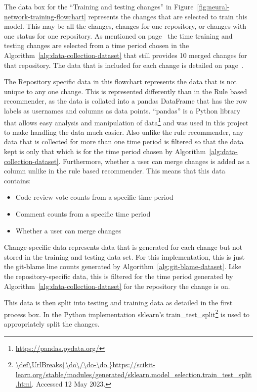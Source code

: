 The data box for the ``Training and testing changes'' in Figure~\ref{fig:neural-network-training-flowchart} represents the changes that are selected to train this model. This may be all the changes, changes for one repository, or changes with one status for one repository. As mentioned on page~\pageref{para:limited-to-ten-merged-changes} the time training and testing changes are selected from a time period chosen in the Algorithm~\ref{alg:data-collection-dataset} that still provides 10 merged changes for that repository. The data that is included for each change is detailed on page~\pageref{para:information-in-each-change-for-testing-data-set}.

The Repository specific data in this flowchart represents the data that is not unique to any one change. This is represented differently than in the Rule based recommender, as the data is collated into a pandas DataFrame that has the row labels as usernames and columns as data points. ``pandas'' is a Python library that allows easy analysis and manipulation of data\footnote{\url{https://pandas.pydata.org/}} and was used in this project to make handling the data much easier. Also unlike the rule recommender, any data that is collected for more than one time period is filtered so that the data kept is only that which is for the time period chosen by Algorithm~\ref{alg:data-collection-dataset}. Furthermore, whether a user can merge changes is added as a column unlike in the rule based recommender. This means that this data contains:
\begin{itemize}
    \item Code review vote counts from a specific time period
    \item Comment counts from a specific time period
    \item Whether a user can merge changes
\end{itemize}

Change-specific data represents data that is generated for each change but not stored in the training and testing data set. For this implementation, this is just the git-blame line counts generated by Algorithm~\ref{alg:git-blame-dataset}. Like the repository-specific data, this is filtered for the time period generated by Algorithm~\ref{alg:data-collection-dataset} for the repository the change is on.

This data is then split into testing and training data as detailed in the first process box. In the Python implementation sklearn's train\_test\_split\footnote{\url{\def\UrlBreaks{\do\/\do-\do.}https://scikit-learn.org/stable/modules/generated/sklearn.model_selection.train_test_split.html}. Accessed 12 May 2023.\def\UrlBreaks{\do\/\do-}} is used to appropriately split the changes.

